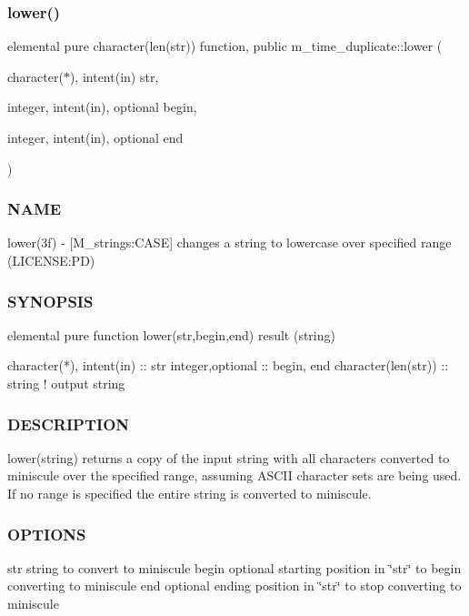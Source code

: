 \subsubsection{\texorpdfstring{lower()}{lower()}}
{\footnotesize\ttfamily elemental pure character(len(str)) function, public m\+\_\+time\+\_\+duplicate\+::lower (\begin{DoxyParamCaption}\item[{character($\ast$), intent(in)}]{str,  }\item[{integer, intent(in), optional}]{begin,  }\item[{integer, intent(in), optional}]{end }\end{DoxyParamCaption})}



\subsubsection*{N\+A\+ME}

lower(3f) -\/ \mbox{[}M\+\_\+strings\+:C\+A\+SE\mbox{]} changes a string to lowercase over specified range (L\+I\+C\+E\+N\+SE\+:PD) 

\subsubsection*{S\+Y\+N\+O\+P\+S\+IS}

\begin{DoxyVerb}elemental pure function lower(str,begin,end) result (string)

 character(*), intent(in) :: str
 integer,optional         :: begin, end
 character(len(str))      :: string  ! output string
\end{DoxyVerb}
 \subsubsection*{D\+E\+S\+C\+R\+I\+P\+T\+I\+ON}

lower(string) returns a copy of the input string with all characters converted to miniscule over the specified range, assuming A\+S\+C\+II character sets are being used. If no range is specified the entire string is converted to miniscule.

\subsubsection*{O\+P\+T\+I\+O\+NS}

str string to convert to miniscule begin optional starting position in \char`\"{}str\char`\"{} to begin converting to miniscule end optional ending position in \char`\"{}str\char`\"{} to stop converting to miniscule

